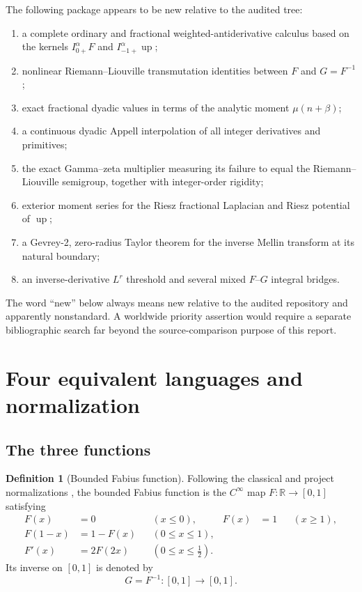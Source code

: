 \documentclass[11pt,oneside]{article}
\theoremstyle{definition}
\newtheorem{definition}[theorem]{Definition}
\theoremstyle{remark}
\newcommand{\Up}{\operatorname{up}}
\newcommand{\R}{\mathbb R}
\newcommand{\1}{\mathbf 1}
\begin{document}
The following package appears to be new relative to the audited tree:
\begin{enumerate}
\item a complete ordinary and fractional weighted-antiderivative calculus based on the kernels
      $I_{0+}^{\alpha}F$ and $I_{-1+}^{\alpha}\Up$;
\item nonlinear Riemann--Liouville transmutation identities between $F$ and $G=F^{-1}$;
\item exact fractional dyadic values in terms of the analytic moment $\mu(n+\beta)$;
\item a continuous dyadic Appell interpolation of all integer derivatives and primitives;
\item the exact Gamma--zeta multiplier measuring its failure to equal the
      Riemann--Liouville semigroup, together with integer-order rigidity;
\item exterior moment series for the Riesz fractional Laplacian and Riesz potential of $\Up$;
\item a Gevrey-2, zero-radius Taylor theorem for the inverse Mellin transform at its natural
      boundary;
\item an inverse-derivative $L^r$ threshold and several mixed $F$--$G$ integral bridges.
\end{enumerate}

The word ``new'' below always means new relative to the audited repository and apparently
nonstandard.  A worldwide priority assertion would require a separate bibliographic search
far beyond the source-comparison purpose of this report.

\section{Four equivalent languages and normalization}
\label{p7:sec:notation}

\subsection{The three functions}

\begin{definition}[Bounded Fabius function]
Following the classical and project normalizations \cite{p7:fabius1966,p7:rvachev1990,p7:project-primary},
the bounded Fabius function is the $C^\infty$ map $F:\R\to[0,1]$ satisfying
\begin{align}
 F(x)&=0 &&(x\le0),& F(x)&=1 &&(x\ge1),\label{p7:eq:F-total}\\
 F(1-x)&=1-F(x) &&(0\le x\le1),\label{p7:eq:F-sym}\\
 F'(x)&=2F(2x) &&(0\le x\le\tfrac12).\label{p7:eq:F-dilation}
\end{align}
Its inverse on $[0,1]$ is denoted by
\[
 G=F^{-1}:[0,1]\longrightarrow[0,1].
\]
\end{definition}
\end{document}
